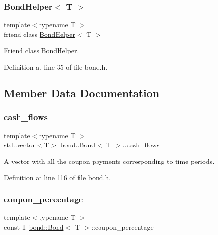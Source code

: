 \subsubsection{\texorpdfstring{Bond\+Helper$<$ T $>$}{BondHelper< T >}}
{\footnotesize\ttfamily template$<$typename T $>$ \\
friend class \hyperlink{classbond_1_1_bond_helper}{Bond\+Helper}$<$ T $>$\hspace{0.3cm}{\ttfamily [friend]}}



Friend class \hyperlink{classbond_1_1_bond_helper}{Bond\+Helper}. 



Definition at line 35 of file bond.\+h.



\subsection{Member Data Documentation}
\mbox{\label{classbond_1_1_bond_ae98011d18cd97942b45f5868a42bf668}} 
\subsubsection{\texorpdfstring{cash\+\_\+flows}{cash\_flows}}
{\footnotesize\ttfamily template$<$typename T $>$ \\
std\+::vector$<$T$>$ \hyperlink{classbond_1_1_bond}{bond\+::\+Bond}$<$ T $>$\+::cash\+\_\+flows\hspace{0.3cm}{\ttfamily [private]}}



A vector with all the coupon payments corresponding to time periods. 



Definition at line 116 of file bond.\+h.

\mbox{\label{classbond_1_1_bond_add6662fd4f8ee756b83a3f818f8c7ada}} 
\subsubsection{\texorpdfstring{coupon\+\_\+percentage}{coupon\_percentage}}
{\footnotesize\ttfamily template$<$typename T $>$ \\
const T \hyperlink{classbond_1_1_bond}{bond\+::\+Bond}$<$ T $>$\+::coupon\+\_\+percentage\hspace{0.3cm}{\ttfamily [private]}}



